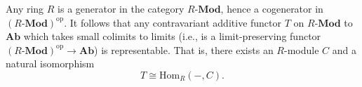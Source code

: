 Any ring $R$ is a generator in the category $R\text{-}\mathbf{Mod}$, hence a cogenerator in $(R\text{-}\mathbf{Mod})^{\mathrm{op}}$. It follows that any contravariant additive functor $T$ on $R\text{-}\mathbf{Mod}$ to $\mathbf{Ab}$ which takes small colimits to limits (i.e., is a limit-preserving functor $(R\text{-}\mathbf{Mod})^{\mathrm{op}} \to \mathbf{Ab}$) is representable. That is, there exists an $R$-module $C$ and a natural isomorphism
\[
T \cong \mathrm{Hom}_R(-, C).
\]
